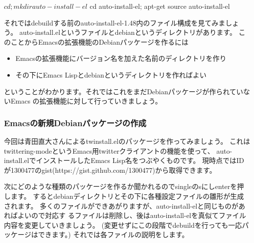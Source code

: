 \documentclass[mingoth,a4paper]{jsarticle}
\begin{document}
\begin{commandline}
 $ cd; mkdir auto-install-el
 $ cd auto-install-el; apt-get source auto-install-el
\end{commandline}

それではdebuildする前のauto-install-el-1.48内のファイル構成を見てみましょう。
auto-install.elというファイルとdebianというディレクトリがあります。
このことからEmacsの拡張機能のDebianパッケージを作るには

\begin{itemize}
 \item Emacsの拡張機能にバージョン名を加えた名前のディレクトリを作り
 \item その下にEmacs Lispとdebianというディレクトリを作ればよい
\end{itemize}

ということがわかります。それではこれをまだDebianパッケージが作られていないEmacs
の拡張機能に対して行っていきましょう。

\subsubsection{Emacsの新規Debianパッケージの作成}

今回は青田直大さんによるtwinstall.elのパッケージを作ってみましょう。
これはtwittering-modeというEmacs用twitterクライアントの機能を使って、
auto-install.elでインストールしたEmacs Lisp名をつぶやくものです。
現時点ではIDが1300477のgist(https://gist.github.com/1300477)から取得できます。


次にどのような種類のパッケージを作るか聞かれるのでsingleのsにしenterを押します。
するとdebianディレクトリとその下に各種設定ファイルの雛形が生成されます。
多くのファイルができあがりますが、auto-install-elと同じものがあればよいので対応す
るファイルは削除し、後はauto-install-elを真似てファイル内容を変更していきましょう。
(変更せずにこの段階でdebuildを行っても一応パッケージはできます。)
それでは各ファイルの説明をします。

\clearpage
\end{document}

